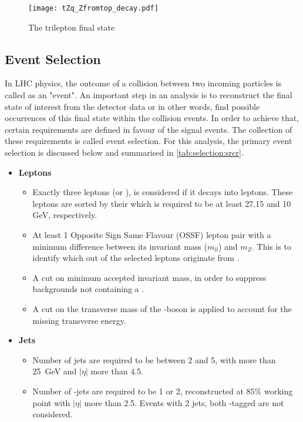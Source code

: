 \begin{figure}
  \centering
      \texttt{[image: tZq\_Zfromtop\_decay.pdf]}
      \caption{The \tZq trilepton final state}
         \label{fig:tZqtrilep}
\end{figure}

\subsection{Event Selection}
\label{sec:evsel}
In LHC physics, the outcome of a collision between two incoming particles is called as an "event".
An important step in an analysis is to reconstruct the final state of interest from the detector data or in other words, find
possible occurrences of this final state within the collision events. In order to achieve that,
certain requirements are defined in favour of the signal events. The collection of these requirements
is called event selection. For this analysis, the primary event selection is discussed below and
summarised in \cref{tab:selection:srcr}.

\begin{itemize}
  \item \textbf{Leptons}
    \begin{itemize}
      \item Exactly three leptons (\Pelectron or \Pmu), 
      \Ptau is considered if it decays into leptons. These leptons are 
      sorted by their \pT which is required to be at least 27,15 and 10 GeV, respectively.
      
      \item At least 1 Opposite Sign Same Flavour (OSSF) lepton pair with a minimum
      difference between its invariant mass ($m_{ll}$) and $m_Z$. This is to identify 
      which out of the selected leptons originate from \PZ.

      \item A cut on minimum accepted invariant mass, in order to suppress backgrounds 
      not containing a \PZ.

      \item A cut on the transverse mass of the \PW-boson is applied to account for the missing
      transverse energy. 
  \end{itemize}
  \item \textbf{Jets}
  \begin{itemize}
    \item Number of jets are required to be between 2 and 5, with \pT more than \qty{25}{GeV}
    and $|\eta|$ more than 4.5.
    \item Number of \Pbottom-jets are required to be 1 or 2, reconstructed at $85\%$ working 
    point with $|\eta|$ more than 2.5. Events with 2 jets, both \Pbottom-tagged are not considered.
  \end{itemize}


\end{itemize}

